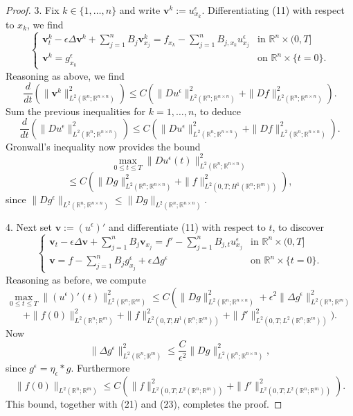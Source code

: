 \begin{proof}
3. Fix $k \in \{1,\ldots,n\}$ and write $\mathbf{v}^k := u^\epsilon_{x_k}$. Differentiating (11) with respect to $x_k$, we find
\[
\left\{\begin{array}{ll}
\mathbf{v}^k_t - \epsilon\Delta\mathbf{v}^k + \sum_{j=1}^n B_j\mathbf{v}^k_{x_j} = f_{x_k} - \sum_{j=1}^n B_{j,x_k}u^\epsilon_{x_j} & \text{in } \mathbb{R}^n \times (0,T] \\
\mathbf{v}^k = g^\epsilon_{x_k} & \text{on } \mathbb{R}^n \times \{t=0\}.
\end{array}\right.
\]
Reasoning as above, we find
\[
\frac{d}{dt}\left(\|\mathbf{v}^k\|^2_{L^2(\mathbb{R}^n;\mathbb{R}^{n \times n})}\right) \leq C\left(\|Du^\epsilon\|^2_{L^2(\mathbb{R}^n;\mathbb{R}^{n \times n})} + \|Df\|^2_{L^2(\mathbb{R}^n;\mathbb{R}^{n \times n})}\right).
\tag{22}
\]
Sum the previous inequalities for $k = 1,\ldots,n$, to deduce
\[
\frac{d}{dt}\left(\|Du^\epsilon\|^2_{L^2(\mathbb{R}^n;\mathbb{R}^{n \times n})}\right) \leq C\left(\|Du^\epsilon\|^2_{L^2(\mathbb{R}^n;\mathbb{R}^{n \times n})} + \|Df\|^2_{L^2(\mathbb{R}^n;\mathbb{R}^{n \times n})}\right).
\]
Gronwall's inequality now provides the bound
\[
\max_{0 \leq t \leq T} \|Du^\epsilon(t)\|^2_{L^2(\mathbb{R}^n;\mathbb{R}^{n \times n})}
\]
\[
\leq C\left(\|Dg\|^2_{L^2(\mathbb{R}^n;\mathbb{R}^{n \times n})} + \|f\|^2_{L^2(0,T;H^1(\mathbb{R}^n;\mathbb{R}^m))}\right),
\tag{23}
\]
since $\|Dg^\epsilon\|_{L^2(\mathbb{R}^n;\mathbb{R}^{n \times n})} \leq \|Dg\|_{L^2(\mathbb{R}^n;\mathbb{R}^{n \times n})}$.

4. Next set $\mathbf{v} := (u^\epsilon)'$ and differentiate (11) with respect to $t$, to discover
\[
\left\{\begin{array}{ll}
\mathbf{v}_t - \epsilon\Delta\mathbf{v} + \sum_{j=1}^n B_j\mathbf{v}_{x_j} = f' - \sum_{j=1}^n B_{j,t}u^\epsilon_{x_j} & \text{in } \mathbb{R}^n \times (0,T] \\
\mathbf{v} = f - \sum_{j=1}^n B_j g^\epsilon_{x_j} + \epsilon\Delta g^\epsilon & \text{on } \mathbb{R}^n \times \{t=0\}.
\end{array}\right.
\tag{24}
\]
Reasoning as before, we compute
\[
\max_{0\leq t \leq T} \|(u^\epsilon)'(t)\|^2_{L^2(\mathbb{R}^n;\mathbb{R}^m)} \leq C\left(\|Dg\|^2_{L^2(\mathbb{R}^n;\mathbb{R}^{n \times n})} + \epsilon^2\|\Delta g^\epsilon\|^2_{L^2(\mathbb{R}^n;\mathbb{R}^m)}\right.
\]
\[
+ \|f(0)\|^2_{L^2(\mathbb{R}^n;\mathbb{R}^m)} + \|f\|^2_{L^2(0,T;H^1(\mathbb{R}^n;\mathbb{R}^m))} + \|f'\|^2_{L^2(0,T;L^2(\mathbb{R}^n;\mathbb{R}^m))}\bigg).
\tag{25}
\]
Now
\[
\|\Delta g^\epsilon\|^2_{L^2(\mathbb{R}^n;\mathbb{R}^m)} \leq \frac{C}{\epsilon^2}\|Dg\|^2_{L^2(\mathbb{R}^n;\mathbb{R}^{n \times n})},
\tag{26}
\]
since $g^\epsilon = \eta_\epsilon * g$. Furthermore
\[
\|f(0)\|_{L^2(\mathbb{R}^n;\mathbb{R}^m)} \leq C\left(\|f\|^2_{L^2(0,T;L^2(\mathbb{R}^n;\mathbb{R}^m))} + \|f'\|^2_{L^2(0,T;L^2(\mathbb{R}^n;\mathbb{R}^m))}\right).
\tag{27}
\]
This bound, together with (21) and (23), completes the proof.
\end{proof}


